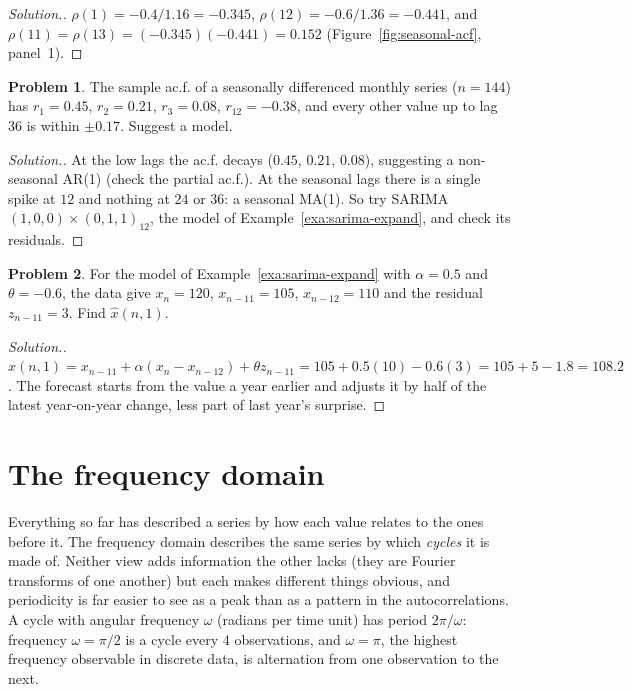 \documentclass[11pt,a4paper]{article}
\theoremstyle{definition}
\newtheorem{problemx}{Problem}[subsection]
\newenvironment{problem}{\begin{problemx}}{\end{problemx}}
\newenvironment{solution}
  {\renewcommand{\qedsymbol}{}\begin{proof}[\textit{Solution}.]}
  {\end{proof}}
\begin{document}
\begin{solution}
$\rho(1) = -0.4/1.16 = -0.345$, $\rho(12) = -0.6/1.36 = -0.441$, and $\rho(11) = \rho(13) = (-0.345)(-0.441) = 0.152$ (Figure~\ref{fig:seasonal-acf}, panel~1).
\end{solution}

\begin{problem}\label{prob:seasonal-identify}
The sample ac.f. of a seasonally differenced monthly series ($n = 144$) has $r_1 = 0.45$, $r_2 = 0.21$, $r_3 = 0.08$, $r_{12} = -0.38$, and every other value
up to lag $36$ is within $\pm0.17$. Suggest a model.
\end{problem}

\begin{solution}
At the low lags the ac.f. decays ($0.45$, $0.21$, $0.08$), suggesting a non-seasonal AR(1) (check the partial ac.f.). At the
seasonal lags there is a single spike at $12$ and nothing at $24$ or $36$: a seasonal MA(1). So try SARIMA $(1, 0, 0) \times (0, 1, 1)_{12}$,
the model of Example~\ref{exa:sarima-expand}, and check its residuals.
\end{solution}

\begin{problem}\label{prob:sarima-onestep}
For the model of Example~\ref{exa:sarima-expand} with $\alpha = 0.5$ and $\theta = -0.6$, the data give $x_n = 120$, $x_{n-11} = 105$, $x_{n-12} = 110$ and the residual
$z_{n-11} = 3$. Find $\hat x(n, 1)$.
\end{problem}

\begin{solution}
$\hat x(n, 1) = x_{n-11} + \alpha(x_n - x_{n-12}) + \theta z_{n-11} = 105 + 0.5(10) - 0.6(3) = 105 + 5 - 1.8 = 108.2$. The forecast starts from the value a year
earlier and adjusts it by half of the latest year-on-year change, less part of last year's surprise.
\end{solution}

\section{The frequency domain}\label{sec:frequency}

Everything so far has described a series by how each value relates to the ones before it. The frequency
domain describes the same series by which \emph{cycles} it is made of. Neither view adds information the other
lacks (they are Fourier transforms of one another) but each makes different things obvious, and periodicity is
far easier to see as a peak than as a pattern in the autocorrelations. A cycle with angular frequency $\omega$
(radians per time unit) has period $2\pi/\omega$: frequency $\omega = \pi/2$ is a cycle every $4$ observations, and $\omega = \pi$, the highest
frequency observable in discrete data, is alternation from one observation to the next.
\end{document}
